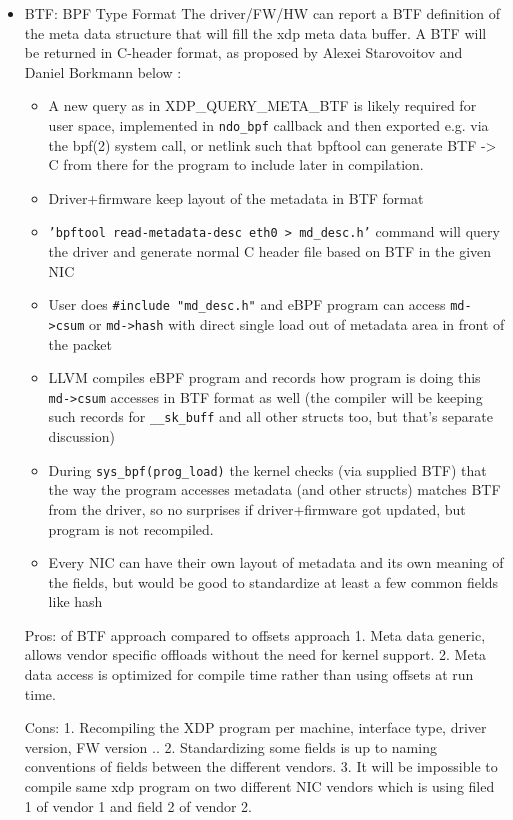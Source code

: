 \documentclass[letterpaper]{article}
\begin{document}
\begin{itemize}
\item BTF: BPF Type Format \cite{btf-patches-2018}
	The driver/FW/HW can report a BTF definition of the meta data structure that will fill the xdp meta data buffer. A BTF will be returned in C-header format, as proposed by Alexei Starovoitov and Daniel Borkmann \cite{mlx-rx-infra-patches-2018} below :
	\begin{itemize}
		\item A new query as in XDP\_QUERY\_META\_BTF is likely required for user space, implemented in \small{\texttt{ndo\_bpf}} callback and then exported e.g. via the bpf(2) system call, or netlink such that bpftool can generate BTF -> C from there for the program to include later in compilation.
		\item Driver+firmware keep layout of the metadata in BTF format
		\item \small{\texttt{'bpftool read-metadata-desc eth0 > md\_desc.h'}} command will query the driver and generate normal C header file based on BTF in the given NIC
		\item User does \small{\texttt{\#include "md\_desc.h"}} and eBPF program can access \small{\texttt{md->csum}} or \small{\texttt{md->hash}} with direct single load out of metadata area in front of the packet
		\item LLVM compiles eBPF program and records how program is doing this \small{\texttt{md->csum}} accesses in BTF format as well (the compiler will be keeping such records for \small{\texttt{\_\_sk\_buff}} and all other structs too, but that's separate discussion)
		\item During \small{\texttt{sys\_bpf(prog\_load)}} the kernel checks (via supplied BTF) that the way the program accesses metadata (and other structs) matches BTF from the driver, so no surprises if driver+firmware got updated, but program is not recompiled.
		\item Every NIC can have their own layout of metadata and its own meaning of the fields, but would be good to standardize at least a few common fields like hash
	\end{itemize}
  
Pros: of BTF approach compared to offsets approach
1. Meta data generic, allows vendor specific offloads without the need for
kernel support.
2. Meta data access is optimized for compile time rather than using offsets at
run time.

Cons:
1. Recompiling the XDP program per machine, interface type, driver version, FW
version .. 
2. Standardizing some fields is up to naming conventions of fields between the
different vendors.
3. It will be impossible to compile same xdp program on two different NIC vendors
which is using filed 1 of vendor 1 and field 2 of vendor 2.

\end{itemize}
\end{document}
